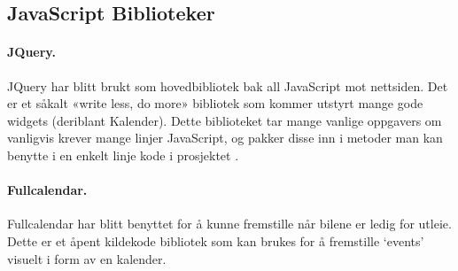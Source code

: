 \subsection{JavaScript Biblioteker}
\paragraph*{JQuery.}
JQuery har blitt brukt som hovedbibliotek bak all JavaScript mot nettsiden. Det er et såkalt «write less, do more» bibliotek som kommer utstyrt mange gode widgets (deriblant Kalender). Dette biblioteket tar mange vanlige oppgavers om vanligvis krever mange linjer JavaScript, og pakker disse inn i metoder man kan benytte i en enkelt linje kode i prosjektet \cite{ jquery:what}. 
\paragraph*{Fullcalendar.}
Fullcalendar har blitt benyttet for å kunne fremstille når bilene er ledig for utleie. Dette er et åpent kildekode bibliotek som kan brukes for å fremstille ‘events’ visuelt i form av en kalender.


\newpage
